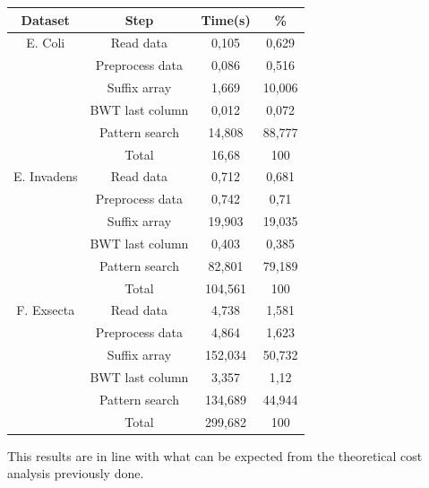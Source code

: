 \documentclass[final,5p,times,twocolumn,authoryear]{elsarticle}
\begin{document}
\begin{center}
\begin{tabular}{|| c c c c ||}
\hline
Dataset & Step & Time(s) & \% \\
\hline
 E. Coli & Read data & 0,105 & 0,629 \\
    & Preprocess data & 0,086 & 0,516 \\
    & Suffix array & 1,669 & 10,006 \\
    & BWT last column & 0,012 & 0,072 \\
    & Pattern search & 14,808 & 88,777 \\
    & Total & 16,68 & 100 \\
\hline
E. Invadens & Read data & 0,712 & 0,681 \\
    & Preprocess data & 0,742 & 0,71 \\
    & Suffix array & 19,903 & 19,035 \\
    & BWT last column & 0,403 & 0,385 \\
    & Pattern search & 82,801 & 79,189 \\
    & Total & 104,561 & 100 \\
\hline
F. Exsecta & Read data & 4,738 & 1,581 \\
    & Preprocess data & 4,864 & 1,623 \\
    & Suffix array & 152,034 & 50,732 \\
    & BWT last column & 3,357 & 1,12 \\
    & Pattern search & 134,689 & 44,944 \\
    & Total & 299,682 & 100 \\
\hline
\end{tabular}
\label{fig:times_table}
\end{center}
This results are in line with what can be expected from the theoretical cost analysis previously done.
\end{document}
